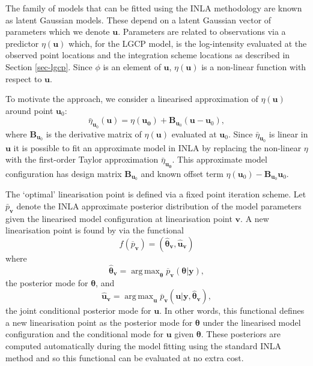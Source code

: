 \documentclass{statsoc}
\newcommand{\ol}[1]{\overline{#1}}
\newcommand{\wh}[1]{\widehat{#1}}
\newcommand{\bm}{\boldsymbol}  %
\DeclareMathOperator*{\argmax}{arg\,max}  %
\begin{document}
The family of models that can be fitted using the INLA methodology are known as latent Gaussian models.  These depend on a latent Gaussian vector of parameters which we denote $\bm{u}$. Parameters are related to observations via a predictor $\eta(\bm{u})$ which, for the LGCP model, is the log-intensity evaluated at the observed point locations and the integration scheme locations as described in Section \ref{sec-lgcp}.  Since $\phi$ is an element of $\bm{u}$, $\eta(\bm{u})$ is a non-linear function with respect to $\bm{u}$.

To motivate the approach, we consider a linearised approximation of $\eta(\bm{u})$ around point $\bm{u}_0$:
\begin{equation*}
\bar{\eta}_{\bm{u}_0} (\bm{u}) = \eta(\bm{u_0}) + \bm{B}_{\bm{u}_0}(\bm{u} - \bm{u}_0),
\end{equation*}
where $\bm{B}_{\bm{u}_0}$ is the derivative matrix of $\eta(\bm{u})$ evaluated at $\bm{u}_0$.  Since $\bar{\eta}_{\bm{u}_0}$ is linear in $\bm{u}$ it is possible to fit an approximate model in INLA by replacing the non-linear $\eta$ with the first-order Taylor approximation $\bar{\eta}_{\bm{u_0}}$.  This approximate model configuration has design matrix $\bm{B}_{\bm{u}_0}$ and known offset term $\eta(\bm{u}_0) - \bm{B}_{\bm{u}_0}\bm{u}_0$.

The `optimal' linearisation point is defined via a fixed point iteration scheme. Let $\bar{p}_{\bm{v}}$ denote the INLA approximate posterior distribution of the model parameters given the linearised model configuration at linearisation point $\bm{v}$.  A new linearisation point is found by via the functional
\begin{equation}
	f(\ol{p}_{\bm{v}}) = (\wh{\bm{\theta}}_{\bm{v}},\wh{\bm{u}}_{\bm{v}})
\end{equation}
where
\begin{equation}
\wh{\bm{\theta}}_{\bm{v}} = \argmax_{\bm{\theta}} \ol{p}_{\bm{v}} ( \bm{\theta} | \bm{y}),
\end{equation}
the posterior mode for $\bm{\theta}$, and
\begin{equation}
\wh{\bm{u}}_{\bm{v}} = \argmax_{\bm{u}} \ol{p}_{\bm{v}} (\bm{u} | \bm{y}, \wh{\bm{\theta}}_{\bm{v}}),
\end{equation}
the joint conditional posterior mode for $\bm{u}$.  In other words, this functional defines a new linearisation point as the posterior mode for $\bm{\theta}$ under the linearised model configuration and the conditional mode for $\bm{u}$ given $\bm{\theta}$.  These posteriors are computed automatically during the model fitting using the standard INLA method and so this functional can be evaluated at no extra cost.
\end{document}
